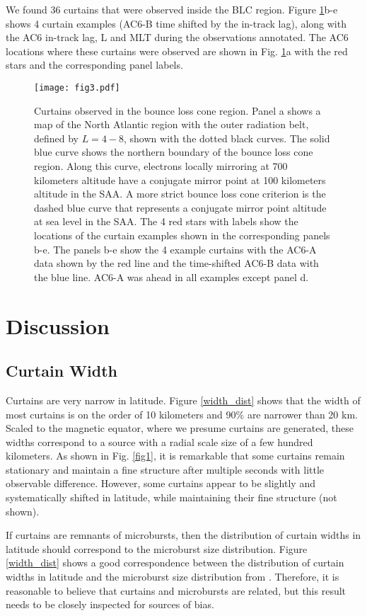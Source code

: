 \documentclass[draft]{agujournal2019}
\begin{document}
We found 36 curtains that were observed inside the BLC region. Figure \ref{fig3}b-e shows 4 curtain examples (AC6-B time shifted by the in-track lag), along with the AC6 in-track lag, L and MLT during the observations annotated. The AC6 locations where these curtains were observed are shown in Fig. \ref{fig3}a with the red stars and the corresponding panel labels.

\begin{figure}
\texttt{[image: fig3.pdf]}
\caption{Curtains observed in the bounce loss cone region. Panel a shows a map of the North Atlantic region with the outer radiation belt, defined by $L=4-8$, shown with the dotted black curves. The solid blue curve shows the northern boundary of the bounce loss cone region. Along this curve, electrons locally mirroring at 700 kilometers altitude have a conjugate mirror point at 100 kilometers altitude in the SAA. A more strict bounce loss cone criterion is the dashed blue curve that represents a conjugate mirror point altitude at sea level in the SAA. The 4 red stars with labels show the locations of the curtain examples shown in the corresponding panels b-e. The panels b-e show the 4 example curtains with the AC6-A data shown by the red line and the time-shifted AC6-B data with the blue line. AC6-A was ahead in all examples except panel d.}
\label{fig3}
\end{figure}

\section{Discussion} \label{discussion}
\subsection{Curtain Width}
Curtains are very narrow in latitude. Figure \ref{width_dist} shows that the width of most curtains is on the order of 10 kilometers and 90\% are narrower than 20 km. Scaled to the magnetic equator, where we presume curtains are generated, these widths correspond to a source with a radial scale size of a few hundred kilometers. As shown in Fig. \ref{fig1}, it is remarkable that some curtains remain stationary and maintain a fine structure after multiple seconds with little observable difference. However, some curtains appear to be slightly and systematically shifted in latitude, while maintaining their fine structure (not shown).

If curtains are remnants of microbursts, then the distribution of curtain widths in latitude should correspond to the microburst size distribution. Figure \ref{width_dist} shows a good correspondence between the distribution of curtain widths in latitude and the microburst size distribution from . Therefore, it is reasonable to believe that curtains and microbursts are related, but this result needs to be closely inspected for sources of bias. 
\end{document}
